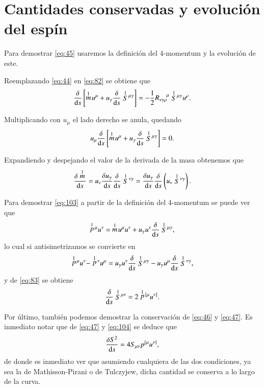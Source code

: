 \chapter{Cantidades conservadas y evoluci\'on del esp\'in}
\label{ape:6}

Para demostrar \eqref{eq:45} usaremos la definición del 4-momentum y la evolución de este.

Reemplazando \eqref{eq:44} en \eqref{eq:82} se obtiene que
\begin{equation}
\cd{} \left[ \des{1}{m} u^{\mu} + u_{\gamma} \cd{} \des{1}{S}^{\mu \gamma} \right] = -\frac{1}{2} R^{\ \ \ \ \mu}_{\nu \gamma \rho} \des{1}{S}^{\mu \gamma} u^{\rho}.
\end{equation}

Multiplicando con $u_{\mu}$ el lado derecho se anula, quedando
\begin{equation}
u_{\mu} \frac{\delta }{\mathrm{d}s} \left[ \stackrel{1}{m}{\!} u^{\mu} + u_{\gamma} \frac{\delta }{\mathrm{d}s} \stackrel{1}{S}{\!}^{\mu \gamma} \right] = 0.
\end{equation}

Expandiendo y despejando el valor de la derivada de la masa obtenemos que
\begin{equation}
\frac{\delta \stackrel{1}{m}{\!}}{\mathrm{d}s} = u_{\nu} \frac{\delta u_{\gamma}}{\mathrm{d}s} \frac{\delta }{\mathrm{d}s} \stackrel{1}{S}{\!}^{\nu \gamma} = \frac{\delta u_{\gamma}}{\mathrm{d}s} \frac{\delta }{\mathrm{d}s} \left( u_{\nu} \stackrel{1}{S}{\!}^{\nu \gamma} \right).
\end{equation}

Para demostrar \eqref{eq:103} a partir de la definición del 4-momentum se puede ver que
\begin{equation}
\stackrel{1}{p}{\!}^{\mu} u^{\nu} = \ \stackrel{1}{m}{\!} u^{\mu} u^{\nu} + u_{\gamma}  u^{\nu} \frac{\delta }{\mathrm{d}s} \stackrel{1}{S}{\!}^{\mu \gamma},
\end{equation}
lo cual si antisimetrizamos se convierte en
\begin{equation}
\stackrel{1}{p}{\!}^{\mu} u^{\nu} - \stackrel{1}{p}{\!}^{\nu} u^{\mu} = u_{\gamma}  u^{\nu} \frac{\delta }{\mathrm{d}s} \stackrel{1}{S}{\!}^{\mu \gamma} - u_{\gamma}  u^{\mu} \frac{\delta }{\mathrm{d}s} \stackrel{1}{S}{\!}^{\nu \gamma},
\end{equation}
y de \eqref{eq:83} se obtiene
\begin{equation}
\label{eq:113}
\frac{\delta }{\mathrm{d}s} \stackrel{1}{S}{\!}^{\mu \nu} = 2 \stackrel{1}{p}{\!}^{[\mu} u^{\nu]}.
\end{equation}

Por último, también podemos demostrar la conservación de \eqref{eq:46} y \eqref{eq:47}. Es inmediato notar que de \eqref{eq:47} y \eqref{eq:104} se deduce que
\begin{equation}
\frac{\delta S^2}{\mathrm{d}s} = 4 S_{\mu \nu} p^{[ \mu} u^{\nu]},
\end{equation}
de donde es inmediato ver que asumiendo cualquiera de las dos condiciones, ya sea la de Mathisson-Pirani o de Tulczyjew, dicha cantidad se conserva a lo largo de la curva.

